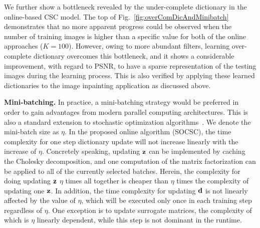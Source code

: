 We further show a bottleneck revealed by the under-complete dictionary in the online-based CSC model. The top of Fig.\ \ref{fig:overComDicAndMinibatch} demonstrates that no more apparent progress could be observed when the number of training images is higher than a specific value for both of the online approaches ($K=100$). However, owing to more abundant filters, learning over-complete dictionary overcomes this bottleneck, and it shows a considerable improvement, with regard to PSNR, to have a sparse representation of the testing images during the learning process. This is also verified by applying these learned dictionaries to the image inpainting application as discussed above.

{\bfseries Mini-batching.} In practice, a mini-batching strategy would be preferred in order to gain advantages from modern parallel computing architectures. This is also a standard extension to stochastic optimization algorithms~\cite{Takac2013, PCDM, SCSG}. We denote the mini-batch size as $\eta$. In the proposed online algorithm (SOCSC), the time complexity for one step dictionary update will not increase linearly with the increase of $\eta$. Concretely speaking, updating $\code$ can be implemented by caching the Cholesky decomposition, and one computation of the matrix factorization can be applied to all of the currently selected batches. Herein, the complexity for doing updating $\code$ $\eta$ times all together is cheaper than $\eta$ times the complexity of updating one $\code$. In addition, the time complexity for updating $\filter$ is not linearly affected by the value of $\eta$, which will be executed only once in each training step regardless of $\eta$. One exception is to update surrogate matrices, the complexity of which is $\eta$ linearly dependent, while this step is not dominant in the runtime.

